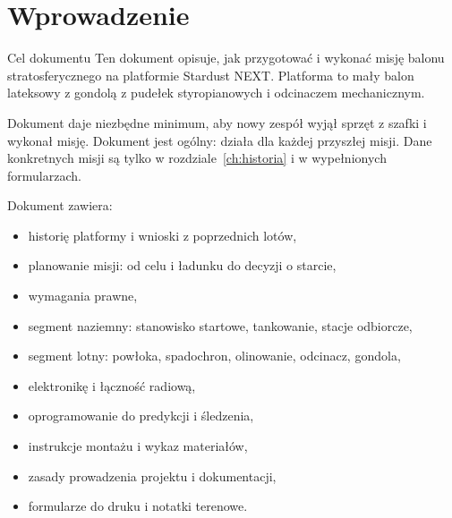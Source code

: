 \chapter{Wprowadzenie}\label{ch:wprowadzenie}

\begin{sekcja}{Cel dokumentu}
Ten dokument opisuje, jak przygotować i wykonać misję balonu stratosferycznego na platformie Stardust NEXT. Platforma to mały balon lateksowy z gondolą z pudełek styropianowych i odcinaczem mechanicznym.

Dokument daje niezbędne minimum, aby nowy zespół wyjął sprzęt z szafki i wykonał misję. Dokument jest ogólny: działa dla każdej przyszłej misji. Dane konkretnych misji są tylko w rozdziale~\ref{ch:historia} i w wypełnionych formularzach.

Dokument zawiera:
\begin{itemize}
  \item historię platformy i wnioski z poprzednich lotów,
  \item planowanie misji: od celu i ładunku do decyzji o starcie,
  \item wymagania prawne,
  \item segment naziemny: stanowisko startowe, tankowanie, stacje odbiorcze,
  \item segment lotny: powłoka, spadochron, olinowanie, odcinacz, gondola,
  \item elektronikę i łączność radiową,
  \item oprogramowanie do predykcji i śledzenia,
  \item instrukcje montażu i wykaz materiałów,
  \item zasady prowadzenia projektu i dokumentacji,
  \item formularze do druku i notatki terenowe.
\end{itemize}
\end{sekcja}

